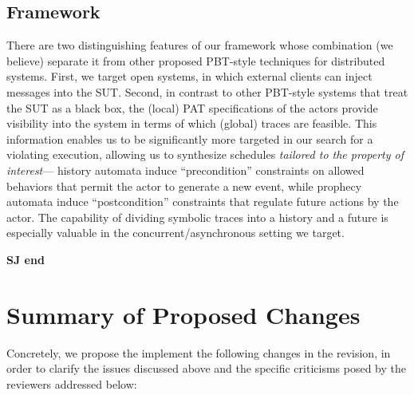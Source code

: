 \subsection{Framework}


There are two distinguishing features of our framework whose
combination (we believe) separate it from other proposed PBT-style
techniques for distributed systems. First, we target open systems, in
which external clients can inject messages into the SUT. Second, in
contrast to other PBT-style systems that treat the SUT as a black box,
the (local) PAT specifications of the actors provide visibility into
the system in terms of which (global) traces are feasible. This
information enables us to be significantly more targeted in our search
for a violating execution, allowing us to synthesize schedules
\emph{tailored to the property of interest}--- history automata induce
``precondition'' constraints on allowed behaviors that permit the
actor to generate a new event, while prophecy automata induce
``postcondition'' constraints that regulate future actions by the
actor. The capability of dividing symbolic traces into a history and a
future is especially valuable in the concurrent/asynchronous setting
we target.


\textbf{SJ end}

\section{Summary of Proposed Changes}
Concretely, we propose the implement the following changes in the revision, in order to clarify the issues discussed above and the specific criticisms posed by the reviewers addressed below:

